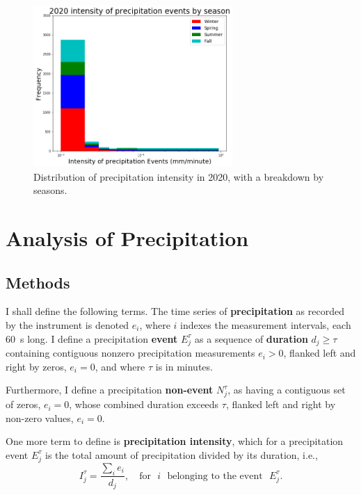 \documentclass[11pt]{report}
\newcommand{\fracd}[2]{\frac{\displaystyle{#1}}{\displaystyle{#2}}}
\begin{document}
\begin{figure}[b]
	\centering
	\includegraphics[width=0.675\textwidth]{Figures/inten2020.png}
	\caption[Intensity histogram for 2020 broken down by season]
	{\label{i2020} Distribution of precipitation intensity in
		2020, with a breakdown by seasons.}
\end{figure}
\clearpage

\section{Analysis of Precipitation}\label{sec:apc}


\subsection{Methods}\label{sec:methods}

I shall define the following terms. The time series of
\textbf{precipitation} as recorded by the instrument is denoted $e_i$, where
$i$ indexes the measurement intervals, each 60~s long. I define a
precipitation \textbf{event} $E_j^\tau $ as a sequence of \textbf{duration}
$d_j\ge \tau$ containing contiguous nonzero precipitation measurements
$e_i>0$, flanked left and right by zeros, $e_i=0$, and where $\tau$ is in
minutes.

Furthermore, I define a precipitation \textbf{non-event} $N_j^\tau$, as
having a contiguous set of zeros, $e_i=0$, whose combined duration exceeds
$\tau$, flanked left and right by non-zero values, $e_i=0$.

One more term to define is \textbf{precipitation intensity}, which for a
precipitation event $E_j^\tau$ is the total amount of precipitation divided
by its duration, i.e.,
\begin{equation}
I_j^\tau = \fracd{\sum_i e_i }{d_j} ,
\quad
\mbox{for}\,\,\,\, i\,\,\,\, \mbox{belonging to the event}\,\,\,\, E_j^\tau
.
\end{equation}
\end{document}
